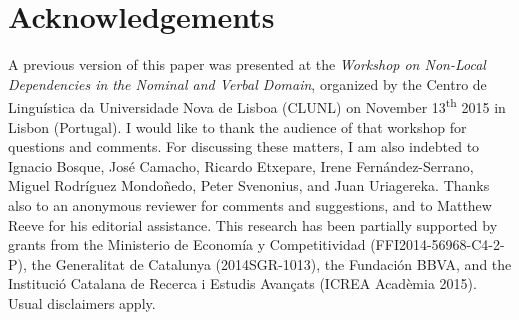 \documentclass[output=paper]{langsci/langscibook}
\begin{document}
\section*{Acknowledgements}
A previous version of this paper was presented at the \textit{Workshop on Non-Local Dependencies in the Nominal and Verbal Domain}, organized by the Centro de Linguística da Universidade Nova de Lisboa (CLUNL) on November 13\textsuperscript{th} 2015 in Lisbon (Portugal). I would like to thank the audience of that workshop for questions and comments. For discussing these matters, I am also indebted to Ignacio Bosque, José Camacho, Ricardo Etxepare, Irene Fernández-Serrano, Miguel Rodríguez Mondoñedo, Peter Svenonius, and Juan Uriagereka. Thanks also to an anonymous reviewer for comments and suggestions, and to Matthew Reeve for his editorial assistance. This research has been partially supported by grants from the Ministerio de Economía y Competitividad (FFI2014-56968-C4-2-P), the Generalitat de Catalunya (2014SGR-1013), the Fundación BBVA, and the Institució Catalana de Recerca i Estudis Avançats (ICREA Acadèmia 2015). Usual disclaimers apply.
\end{document}
